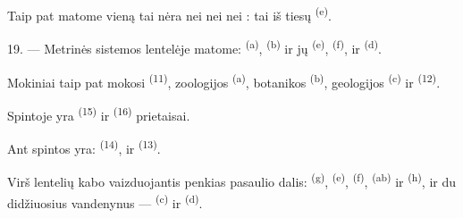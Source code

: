 Taip pat matome vieną  tai nėra nei  nei
 nei : tai iš tiesų 
\textsuperscript{(e)}.

19. --- Metrinės sistemos lentelėje matome:  \textsuperscript{(a)},
 \textsuperscript{(b)} ir jų  
\textsuperscript{(e)},  \textsuperscript{(f)},  ir
 \textsuperscript{(d)}.

Mokiniai taip pat mokosi  \textsuperscript{(11)}, zoologijos
\textsuperscript{(a)}, botanikos \textsuperscript{(b)}, geologijos
\textsuperscript{(c)} ir  \textsuperscript{(12)}.

Spintoje yra  \textsuperscript{(15)} ir 
\textsuperscript{(16)} prietaisai.

Ant spintos yra:  \textsuperscript{(14)},  ir
 \textsuperscript{(13)}.

Virš lentelių kabo  vaizduojantis penkias pasaulio dalis:
 \textsuperscript{(g)},  \textsuperscript{(e)},
 \textsuperscript{(f)},  \textsuperscript{(ab)} ir
 \textsuperscript{(h)}, ir du didžiuosius vandenynus ---
 \textsuperscript{(c)} ir  \textsuperscript{(d)}.
\VUsaut{6.0mm}
\VUfilet{22mm}
